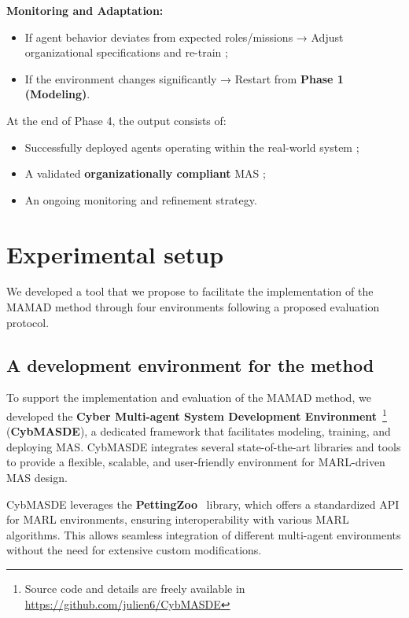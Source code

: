 \documentclass[pdflatex,sn-mathphys-num]{sn-jnl}%
\theoremstyle{thmstyleone}%
\theoremstyle{thmstyletwo}%
\theoremstyle{thmstylethree}%
\begin{document}
\noindent \textbf{Monitoring and Adaptation:}
\begin{itemize}
    \item If agent behavior deviates from expected roles/missions → Adjust organizational specifications and re-train ;
    \item If the environment changes significantly → Restart from \textbf{Phase 1 (Modeling)}.
\end{itemize}

At the end of Phase 4, the output consists of:
\begin{itemize}
    \item Successfully deployed agents operating within the real-world system ;
    \item A validated \textbf{organizationally compliant} MAS ;
    \item An ongoing monitoring and refinement strategy.
\end{itemize}



\section{Experimental setup}
\label{sec:experimental_setup}

We developed a tool that we propose to facilitate the implementation of the MAMAD method through four environments following a proposed evaluation protocol.

\subsection{A development environment for the method}

To support the implementation and evaluation of the MAMAD method, we developed the \textbf{Cyber Multi-agent System Development Environment}~\footnote{Source code and details are freely available in \url{https://github.com/julien6/CybMASDE}} (\textbf{CybMASDE}), a dedicated framework that facilitates modeling, training, and deploying MAS. CybMASDE integrates several state-of-the-art libraries and tools to provide a flexible, scalable, and user-friendly environment for MARL-driven MAS design.

CybMASDE leverages the \textbf{PettingZoo}~\cite{Terry2021} library, which offers a standardized API for MARL environments, ensuring interoperability with various MARL algorithms. This allows seamless integration of different multi-agent environments without the need for extensive custom modifications.
\end{document}
